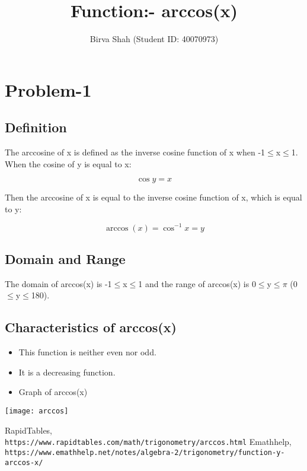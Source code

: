 \documentclass[12pt]{article}
\title{Function:- arccos(x)}
\author{Birva Shah (Student ID: 40070973)}
\begin{document}
\maketitle
\section{Problem-1}
\subsection{Definition}
The arccosine of x is defined as the inverse cosine function of x when -1$\leq$x$\leq$1.
When the cosine of y is equal to x:
\begin{myequation}%
$$\cos y = x$$
\end{myequation}
Then the arccosine of x is equal to the inverse cosine function of x, which is equal to y:
\begin{myequation}%
$$\arccos(x) = \cos^{-1} x = y$$
\end{myequation}
\subsection{Domain and Range}
The domain of arccos(x) is -1$\leq$x$\leq$1 and the range of arccos(x) is 0$\leq$y$\leq$$\pi$ \big(0\textdegree$\leq$y$\leq$180\textdegree\big).
\subsection{Characteristics of arccos(x)}
\begin{itemize}
  \item This function is neither even nor odd.
  \item It is a decreasing function.
  \item Graph of arccos(x)
\end{itemize}
\texttt{[image: arccos]}
\begin{thebibliography}{9}
RapidTables,
\\\texttt{https://www.rapidtables.com/math/trigonometry/arccos.html}
Emathhelp,
\\\texttt{https://www.emathhelp.net/notes/algebra-2/trigonometry/function-y-arccos-x/}
\end{thebibliography}
\end{document}
